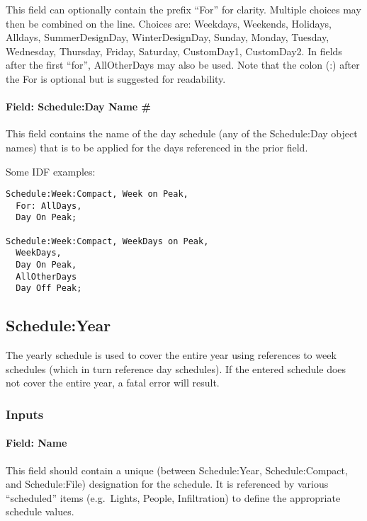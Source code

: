 This field can optionally contain the prefix ``For'' for clarity. Multiple choices may then be combined on the line. Choices are: Weekdays, Weekends, Holidays, Alldays, SummerDesignDay, WinterDesignDay, Sunday, Monday, Tuesday, Wednesday, Thursday, Friday, Saturday, CustomDay1, CustomDay2. In fields after the first ``for'', AllOtherDays may also be used. Note that the colon (:) after the For is optional but is suggested for readability.

\paragraph{Field: Schedule:Day Name \#}\label{field-scheduleday-name}

This field contains the name of the day schedule (any of the Schedule:Day object names) that is to be applied for the days referenced in the prior field.

Some IDF examples:

\begin{lstlisting}
Schedule:Week:Compact, Week on Peak,
  For: AllDays,
  Day On Peak;

Schedule:Week:Compact, WeekDays on Peak,
  WeekDays,
  Day On Peak,
  AllOtherDays
  Day Off Peak;
\end{lstlisting}

\subsection{Schedule:Year}\label{scheduleyear}

The yearly schedule is used to cover the entire year using references to week schedules (which in turn reference day schedules). If the entered schedule does not cover the entire year, a fatal error will result.

\subsubsection{Inputs}\label{inputs-6-023}

\paragraph{Field: Name}\label{field-name-5-021}

This field should contain a unique (between Schedule:Year, Schedule:Compact, and Schedule:File) designation for the schedule. It is referenced by various ``scheduled'' items (e.g.~Lights, People, Infiltration) to define the appropriate schedule values.

